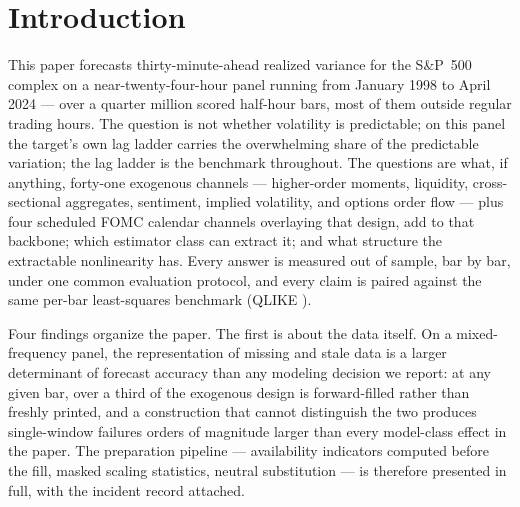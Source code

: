 \section{Introduction}
\label{sec:intro}
\ifdefined\cmNdays\else\fi
\ifdefined\runappRpNdays\else\fi

This paper forecasts thirty-minute-ahead realized variance for the
S\&P~500 complex on a near-twenty-four-hour panel running from January
1998 to April 2024 --- over a quarter million scored half-hour bars,
most of them outside regular trading hours. The question is not whether
volatility is predictable; on this panel the target's own lag ladder
carries the overwhelming share of the predictable variation; the lag
ladder is the benchmark throughout. The questions are what, if anything,
forty-one exogenous channels --- higher-order moments, liquidity,
cross-sectional aggregates, sentiment, implied volatility, and options
order flow --- plus four scheduled FOMC calendar channels overlaying
that design, add to that backbone; which estimator class can extract
it; and what structure the extractable nonlinearity has. Every answer is
measured out of sample, bar by bar, under one common evaluation
protocol, and every claim is paired against the same per-bar
least-squares benchmark (QLIKE \unifAzeroQLIKE{}).

Four findings organize the paper. The first is about the data itself.
On a mixed-frequency panel, the representation of missing and stale data
is a larger determinant of forecast accuracy than any modeling decision
we report: at any given bar, over a third of the exogenous design is
forward-filled rather than freshly printed, and a construction that
cannot distinguish the two produces single-window failures orders of
magnitude larger than every model-class effect in the paper. The
preparation pipeline --- availability indicators computed before the
fill, masked scaling statistics, neutral substitution --- is therefore
presented in full, with the incident record attached.


